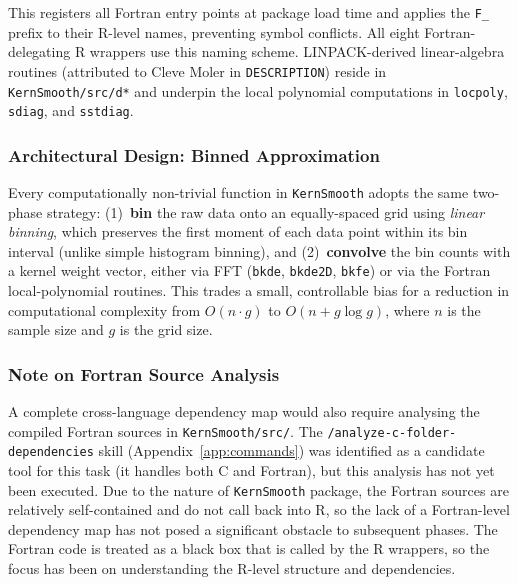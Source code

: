 \documentclass[12pt,a4paper]{article}
\begin{document}
This registers all Fortran entry points at package load time and applies the \texttt{F\_} prefix to their R-level names, preventing symbol conflicts. All eight Fortran-delegating R wrappers use this naming scheme. LINPACK-derived linear-algebra routines (attributed to Cleve Moler in \texttt{DESCRIPTION}) reside in \texttt{KernSmooth/src/d*} and underpin the local polynomial computations in \texttt{locpoly}, \texttt{sdiag}, and \texttt{sstdiag}.

\subsubsection{Architectural Design: Binned Approximation}

Every computationally non-trivial function in \texttt{KernSmooth} adopts the same two-phase strategy: (1)~\textbf{bin} the raw data onto an equally-spaced grid using \emph{linear binning}, which preserves the first moment of each data point within its bin interval (unlike simple histogram binning), and (2)~\textbf{convolve} the bin counts with a kernel weight vector, either via FFT (\texttt{bkde}, \texttt{bkde2D}, \texttt{bkfe}) or via the Fortran local-polynomial routines. This trades a small, controllable bias for a reduction in computational complexity from $O(n \cdot g)$ to $O(n + g \log g)$, where $n$ is the sample size and $g$ is the grid size.

\subsubsection{Note on Fortran Source Analysis}

A complete cross-language dependency map would also require analysing the compiled Fortran sources in \texttt{KernSmooth/src/}. The \texttt{/analyze-c-folder-dependencies} skill (Appendix~\ref{app:commands}) was identified as a candidate tool for this task (it handles both C and Fortran), but this analysis has not yet been executed. Due to the nature of \texttt{KernSmooth} package, the Fortran sources are relatively self-contained and do not call back into R, so the lack of a Fortran-level dependency map has not posed a significant obstacle to subsequent phases. The Fortran code is treated as a black box that is called by the R wrappers, so the focus has been on understanding the R-level structure and dependencies.

\end{document}
